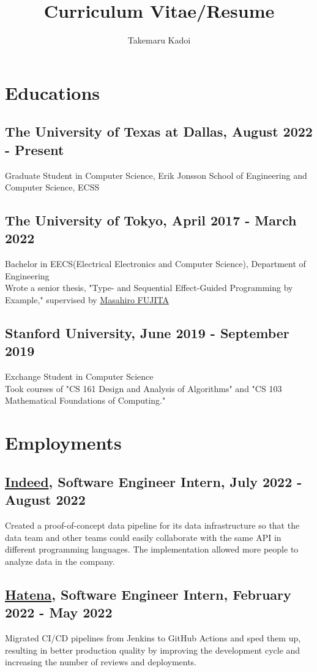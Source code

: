 \documentclass[10pt]{article}
\title{\vspace{-1cm}Curriculum Vitae/Resume}
\author{Takemaru Kadoi}
\date{}
\begin{document}
\section*{Educations}
  \subsection*{The University of Texas at Dallas, August 2022 - Present}
    Graduate Student in Computer Science, Erik Jonsson School of Engineering and Computer Science, ECSS
  \subsection*{The University of Tokyo, April 2017 - March 2022}
    Bachelor in EECS(Electrical Electronics and Computer Science), Department of Engineering
    \\
    Wrote a senior thesis, "Type- and Sequential Effect-Guided Programming by Example," supervised by \href{https://www.cad.t.u-tokyo.ac.jp/en/}{Masahiro FUJITA}
  \subsection*{Stanford University, June 2019 - September 2019}
    Exchange Student in Computer Science
    \\
    Took courses of "CS 161 Design and Analysis of Algorithms" and "CS 103 Mathematical Foundations of Computing."

\section*{Employments}
  \subsection*{\href{https://www.indeed.com/about}{Indeed}, Software Engineer Intern, July 2022 - August 2022}
    Created a proof-of-concept data pipeline for its data infrastructure so that the data team and other teams could easily collaborate with the same API in different programming languages.
    The implementation allowed more people to analyze data in the company.
  \subsection*{\href{https://hatenacorp.jp/}{Hatena}, Software Engineer Intern, February 2022 - May 2022}
    Migrated CI/CD pipelines from Jenkins to GitHub Actions and sped them up, resulting in better production quality by improving the development cycle and increasing the number of reviews and deployments.
\end{document}
